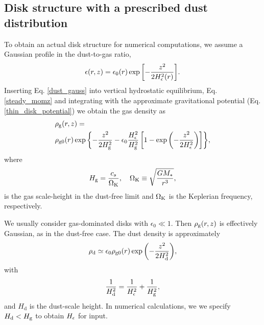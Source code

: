 \subsection{Disk structure with a prescribed dust distribution}\label{steady_state}  
To obtain an actual disk structure for numerical computations, we
assume a Gaussian profile in the dust-to-gas ratio,   
\begin{align}\label{dust_gauss}
  \epsilon(r,z) = \epsilon_0(r)
  \exp{\left[-\frac{z^2}{2H_\epsilon^2(r)}\right]}. 
\end{align}
Inserting Eq. \ref{dust_gauss} into vertical hydrostatic equilibrium,
Eq. \ref{steady_momz} and integrating with the approximate
gravitational potential (Eq. \ref{thin_disk_potential}) we obtain the
gas density as
\begin{align}
  &\rho_\mathrm{g}(r,z)= \notag\\
&\rho_\mathrm{g0}(r)\exp{\left\{ - \frac{z^2}{2H_\mathrm{g}^2}
    -\epsilon_0\frac{H_\epsilon^2}{H_\mathrm{g}^2}\left[1 -
      \exp{\left(-\frac{z^2}{2H_\epsilon^2}\right)}\right] \right\}}, 
\end{align}
where
\begin{align}
  H_\mathrm{g} = \frac{c_s}{\Omega_{\rm K}}, \quad \Omega_{\rm K} \equiv \sqrt{\frac{GM_*}{r^3}},   
\end{align}
is the gas scale-height in the dust-free limit and $\Omega_{\rm K}$ is the
Keplerian frequency, respectively. 

We usually consider gas-dominated disks with $\epsilon_0 \ll 1$.  
Then $\rho_\mathrm{g}(r,z)$ is effectively Gaussian, as in the 
dust-free case. The dust density is approximately 
\begin{align}
  \rho_\mathrm{d} \simeq \epsilon_0\rho_\mathrm{g0}(r) \exp
        {\left(-\frac{z^2}{2H_\mathrm{d}^2}\right)}, 
\end{align}
with 
\begin{align}
  \frac{1}{H_\mathrm{d}^2} = \frac{1}{H_\epsilon^2} + \frac{1}{H_\mathrm{g}^2}, 
\end{align}
and $H_\mathrm{d}$ is the dust-scale height. In numerical
calculations, we  we specify $H_\mathrm{d}< H_\mathrm{g}$ to obtain 
$H_\epsilon$ for input. 

